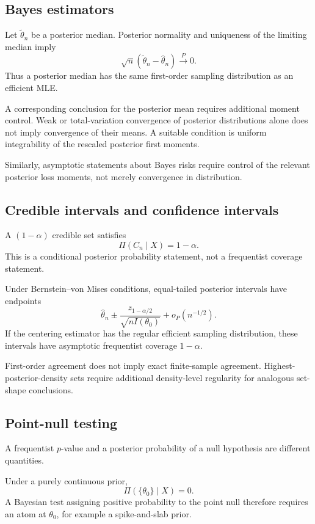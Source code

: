 \subsection{Bayes estimators}

Let $\widetilde\theta_n$ be a posterior median. Posterior normality
and uniqueness of the limiting median imply
\[
\sqrt n(\widetilde\theta_n-\widehat\theta_n)
\xrightarrow{P}0.
\]
Thus a posterior median has the same first-order sampling
distribution as an efficient MLE.

A corresponding conclusion for the posterior mean requires
additional moment control. Weak or total-variation convergence of
posterior distributions alone does not imply convergence of their
means. A suitable condition is uniform integrability of the
rescaled posterior first moments.

Similarly, asymptotic statements about Bayes risks require control
of the relevant posterior loss moments, not merely convergence in
distribution.

\subsection{Credible intervals and confidence intervals}

A $(1-\alpha)$ credible set satisfies
\[
\Pi(C_n\mid X)=1-\alpha.
\]
This is a conditional posterior probability statement, not a
frequentist coverage statement.

Under Bernstein--von Mises conditions, equal-tailed posterior
intervals have endpoints
\[
\widehat\theta_n
\pm
\frac{z_{1-\alpha/2}}{\sqrt{nI(\theta_0)}}
+o_P(n^{-1/2}).
\]
If the centering estimator has the regular efficient sampling
distribution, these intervals have asymptotic frequentist coverage
$1-\alpha$.

First-order agreement does not imply exact finite-sample agreement.
Highest-posterior-density sets require additional density-level
regularity for analogous set-shape conclusions.

\subsection{Point-null testing}

A frequentist $p$-value and a posterior probability of a null
hypothesis are different quantities.

Under a purely continuous prior,
\[
\Pi(\{\theta_0\}\mid X)=0.
\]
A Bayesian test assigning positive probability to the point null
therefore requires an atom at $\theta_0$, for example a
spike-and-slab prior.


